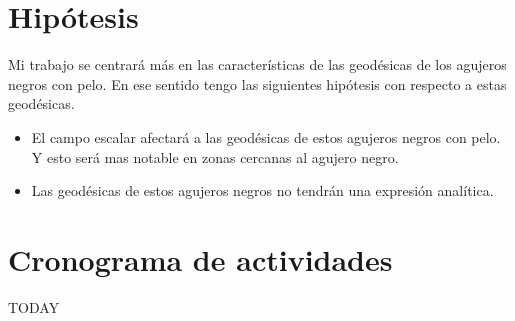 \documentclass[../Main.tex]{subfiles}
\begin{document}
\section{Hipótesis}
Mi trabajo se centrará más en las características de las geodésicas de los agujeros negros con pelo. En ese sentido tengo las siguientes hipótesis con respecto a estas geodésicas.

\begin{itemize}
    \item El campo escalar afectará a las geodésicas de estos agujeros negros con pelo. Y esto será mas notable en zonas cercanas al agujero negro.
    \item Las geodésicas de estos agujeros negros no tendrán una expresión analítica.
\end{itemize}

\section{Cronograma de actividades}

TODAY



\biblio %
\end{document}
